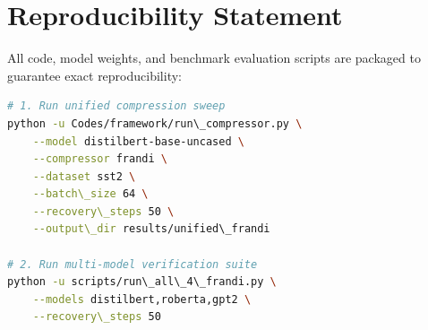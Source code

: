 \section{Reproducibility Statement}
All code, model weights, and benchmark evaluation scripts are packaged to guarantee exact reproducibility:
\begin{lstlisting}[language=bash]
# 1. Run unified compression sweep
python -u Codes/framework/run\_compressor.py \
    --model distilbert-base-uncased \
    --compressor frandi \
    --dataset sst2 \
    --batch\_size 64 \
    --recovery\_steps 50 \
    --output\_dir results/unified\_frandi

# 2. Run multi-model verification suite
python -u scripts/run\_all\_4\_frandi.py \
    --models distilbert,roberta,gpt2 \
    --recovery\_steps 50
\end{lstlisting}
